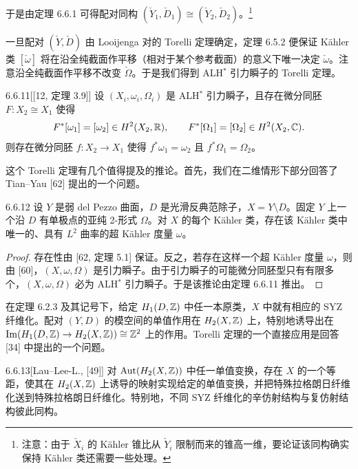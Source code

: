 于是由定理 6.6.1 可得配对同构 $(\check Y_1,\check D_1)\cong(\check Y_2,\check D_2)$。\footnote{注意：由于 $\check X_i$ 的 Kähler 锥比从 $\check Y_i$ 限制而来的锥高一维，要论证该同构确实保持 Kähler 类还需要一些处理。}

一旦配对 $(\check Y,\check D)$ 由 Looijenga 对的 Torelli 定理确定，定理 6.5.2 便保证 Kähler 类 $[\check\omega]$ 将在沿全纯截面作平移（相对于某个参考截面）的意义下唯一决定 $\check\omega$。注意沿全纯截面作平移不改变 $\check\Omega$。于是我们得到 ALH$^*$ 引力瞬子的 Torelli 定理。

\begin{theorem}{6.6.11}[{[12, 定理 3.9]}]
设 $(X_i,\omega_i,\Omega_i)$ 是 ALH$^*$ 引力瞬子，且存在微分同胚 $F:X_2\cong X_1$ 使得
\[
F^*[\omega_1]=[\omega_2]\in H^2(X_2,\mathbb{R}),\qquad F^*[\Omega_1]=[\Omega_2]\in H^2(X_2,\mathbb{C}).
\]
则存在微分同胚 $f:X_2\to X_1$ 使得 $f^*\omega_1=\omega_2$ 且 $f^*\Omega_1=\Omega_2$。
\end{theorem}

这个 Torelli 定理有几个值得提及的推论。首先，我们在二维情形下部分回答了 Tian--Yau [62] 提出的一个问题。

\begin{corollary}{6.6.12}
设 $Y$ 是弱 del Pezzo 曲面，$D$ 是光滑反典范除子，$X=Y\setminus D$。固定 $Y$ 上一个沿 $D$ 有单极点的亚纯 2-形式 $\Omega$。对 $X$ 的每个 Kähler 类，存在该 Kähler 类中唯一的、具有 $L^2$ 曲率的超 Kähler 度量 $\omega$。
\end{corollary}

\begin{proof}
存在性由 [62, 定理 5.1] 保证。反之，若存在这样一个超 Kähler 度量 $\omega$，则由 [60]，$(X,\omega,\Omega)$ 是引力瞬子。由于引力瞬子的可能微分同胚型只有有限多个，$(X,\omega,\Omega)$ 必为 ALH$^*$ 引力瞬子。于是该推论由定理 6.6.11 推出。\proofend
\end{proof}

在定理 6.2.3 及其记号下，给定 $H_1(D,\mathbb{Z})$ 中任一本原类，$X$ 中就有相应的 SYZ 纤维化。配对 $(Y,D)$ 的模空间的单值作用在 $H_2(X,\mathbb{Z})$ 上，特别地诱导出在 $\operatorname{Im}(H_1(D,\mathbb{Z})\to H_2(X,\mathbb{Z}))\cong\mathbb{Z}^2$ 上的作用。Torelli 定理的一个直接应用是回答 [34] 中提出的一个问题。

\begin{proposition}{6.6.13}[{Lau--Lee-L., [49]}]
对 $\operatorname{Aut}(H_2(X,\mathbb{Z}))$ 中任一单值变换，存在 $X$ 的一个等距，使其在 $H_2(X,\mathbb{Z})$ 上诱导的映射实现给定的单值变换，并把特殊拉格朗日纤维化送到特殊拉格朗日纤维化。特别地，不同 SYZ 纤维化的辛仿射结构与复仿射结构彼此同构。
\end{proposition}

